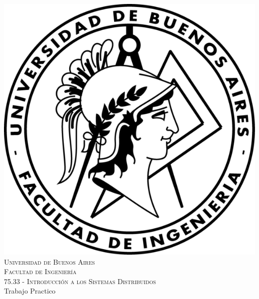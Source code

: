 \documentclass[11pt,a4paper]{article}
\begin{document}
\begin{titlepage}
\newcommand{\HRule}{\rule{\linewidth}{0.5mm}}
\center

\includegraphics{images/logofiuba.png}\\[1cm]
\textsc{\Large Universidad de Buenos Aires}\\[1cm]
\textsc{\large Facultad de Ingeniería}\\[1.5cm]
\textsc{\LARGE 75.33 - Introducción a los Sistemas Distribuidos}\\[0.5cm]
    \Large Trabajo Practico
    \\[0.2cm]

    \vskip 2cm
    

\end{titlepage}
\end{document}
